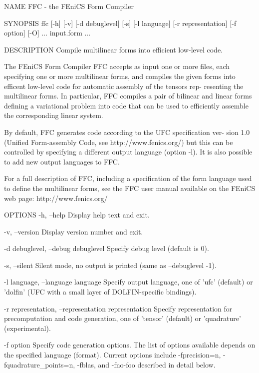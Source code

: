 NAME
       FFC - the FEniCS Form Compiler


SYNOPSIS
       ffc  [-h]  [-v]  [-d debuglevel] [-s] [-l language] [-r representation]
       [-f option] [-O] ... input.form ...


DESCRIPTION
       Compile multilinear forms into efficient low-level code.

       The FEniCS Form Compiler FFC accepts as input one or more  files,  each
       specifying  one or more multilinear forms, and compiles the given forms
       into efficent low-level code for automatic assembly of the tensors rep-
       resenting  the multilinear forms. In particular, FFC compiles a pair of
       bilinear and linear forms defining a variational problem into code that
       can be used to efficiently assemble the corresponding linear system.

       By  default, FFC generates code according to the UFC specification ver-
       sion 1.0 (Unified Form-assembly Code, see  http://www.fenics.org/)  but
       this  can  be  controlled  by  specifying  a  different output language
       (option -l). It is also possible to add new output languages to FFC.

       For a full description of FFC, including a specification  of  the  form
       language  used to define the multilinear forms, see the FFC user manual
       available on the FEniCS web page: http://www.fenics.org/


OPTIONS
       -h, --help
              Display help text and exit.

       -v, --version
              Display version number and exit.

       -d debuglevel, --debug debuglevel
              Specify debug level (default is 0).

       -s, --silent
              Silent mode, no output is printed (same as --debuglevel -1).

       -l language, --language language
              Specify output language, one of 'ufc' (default) or 'dolfin' (UFC
              with a small layer of DOLFIN-specific bindings).

       -r representation, --representation representation
              Specify  representation  for precomputation and code generation,
              one of 'tensor' (default) or 'quadrature' (experimental).

       -f option
              Specify code generation options. The list of  options  available
              depends  on  the  specified  language  (format). Current options
              include   -fprecision=n,   -fquadrature_points=n,   -fblas,  and
              -fno-foo described in detail below.
        
